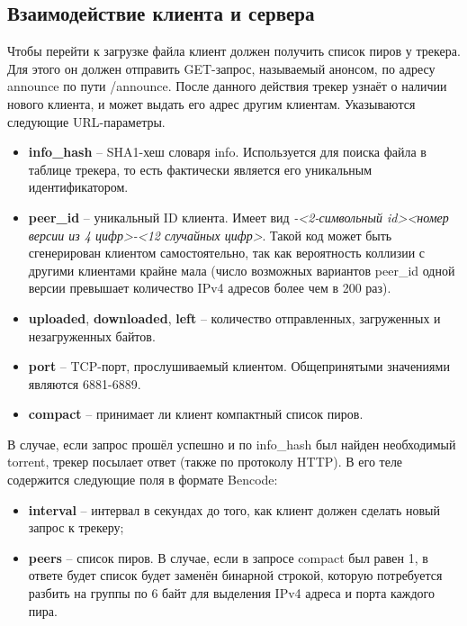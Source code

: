 \subsection{Взаимодействие клиента и сервера}
Чтобы перейти к загрузке файла клиент должен получить список пиров у трекера. Для этого он должен отправить GET-запрос, называемый анонсом, по адресу announce по пути /announce. После данного действия трекер узнаёт о наличии нового клиента, и может выдать его адрес другим клиентам. Указываются следующие URL-параметры.

\begin{itemize}
	\item \textbf{info\_hash} -- SHA1-хеш словаря info. Используется для поиска файла в таблице трекера, то есть фактически является его уникальным идентификатором.
	
	\item \textbf{peer\_id} -- уникальный ID клиента. Имеет вид \textit{-<2-символьный id><номер версии из 4 цифр>-<12 случайных цифр>}. Такой код может быть сгенерирован клиентом самостоятельно, так как вероятность коллизии с другими клиентами крайне мала (число возможных вариантов peer\_id одной версии превышает количество IPv4 адресов более чем в 200 раз).
	
	\item \textbf{uploaded}, \textbf{downloaded}, \textbf{left} -- количество отправленных, загруженных и незагруженных байтов.
	
	\item \textbf{port} -- TCP-порт, прослушиваемый клиентом. Общепринятыми значениями являются 6881-6889.
	
	\item \textbf{compact} -- принимает ли клиент компактный список пиров. \\
	
\end{itemize}

В случае, если запрос прошёл успешно и по info\_hash был найден необходимый torrent, трекер посылает ответ (также по протоколу HTTP). В его теле содержится следующие поля в формате Bencode:
\begin{itemize}
	\item \textbf{interval} -- интервал в секундах до того, как клиент должен сделать новый запрос к трекеру;
	
	\item \textbf{peers} -- список пиров. В случае, если в запросе compact был равен 1, в ответе будет список будет заменён бинарной строкой, которую потребуется разбить на группы по 6 байт для выделения IPv4 адреса и порта каждого пира. \\
\end{itemize}

